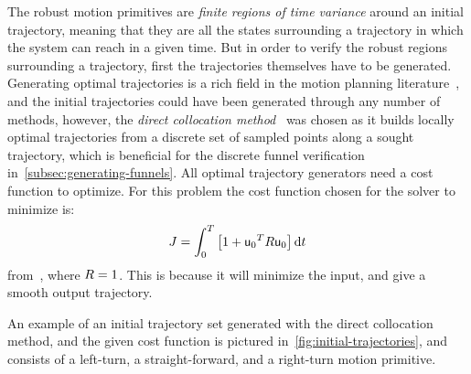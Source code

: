 The robust motion primitives are \textit{finite regions of time variance} around
an initial trajectory, meaning that they are all the states surrounding a
trajectory in which the system can reach in a given time. But in order to verify
the robust regions surrounding a trajectory, first the trajectories themselves
have to be generated. Generating optimal trajectories is a rich field in the
motion planning literature~\cite{Betts_1998}, and the initial trajectories could
have been generated through any number of methods, however, the \textit{direct
  collocation method}~\cite{von1993numerical} was chosen as it builds locally
optimal trajectories from a discrete set of sampled points along a sought
trajectory, which is beneficial for the discrete funnel verification
in~\cref{subsec:generating-funnels}. All optimal trajectory generators need a
cost function to optimize. For this problem the cost function chosen for the
solver to minimize is:
\begin{equation}
  J = \int_{0}^{T} \left[ 1 + {{\mathbf{\mathsf{u}}}_{0}}^{T} R {\mathbf{\mathsf{u}}}_{0} \right] \mathrm{d}t
\end{equation}
from~\cite{majumdarRobustOnlineMotion2013}, where \(R = 1\). This is
because it will minimize the input, and give a smooth output trajectory.

An example of an initial trajectory set generated with the direct collocation
method, and the given cost function is pictured
in~\cref{fig:initial-trajectories}, and consists of a left-turn, a
straight-forward, and a right-turn motion primitive.

